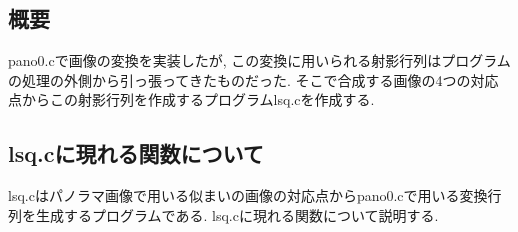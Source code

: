 \documentclass[a4j]{jarticle}
\begin{document}
\subsection{概要}
pano0.cで画像の変換を実装したが, この変換に用いられる射影行列はプログラムの処理の外側から引っ張ってきたものだった.
そこで合成する画像の4つの対応点からこの射影行列を作成するプログラムlsq.cを作成する.

\subsection{lsq.cに現れる関数について}
lsq.cはパノラマ画像で用いる似まいの画像の対応点からpano0.cで用いる変換行列を生成するプログラムである. lsq.cに現れる関数について説明する.
\end{document}
